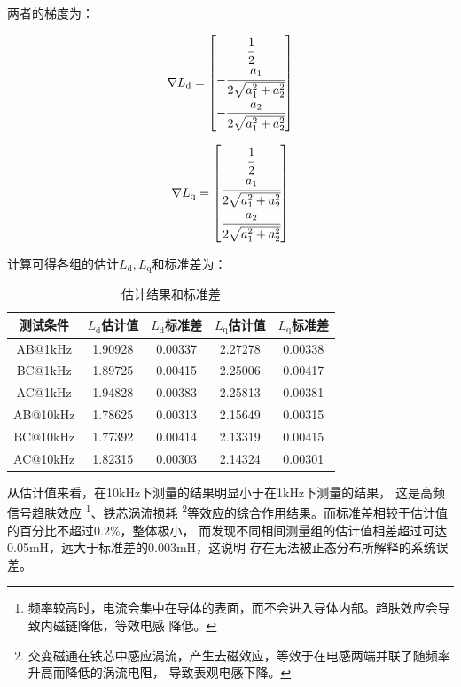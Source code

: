 两者的梯度为：

\begin{minipage}{0.5\textwidth}
    \begin{equation*}
        \nabla L_{\mathrm{d}} =\begin{bmatrix}\cfrac{1}{2}\\-\cfrac{a_{1}}{2\sqrt{a_{1}^2+a_{2}^2}}\\
        -\cfrac{a_{2}}{2\sqrt{a_{1}^2+a_{2}^2}}\end{bmatrix}
    \end{equation*}
\end{minipage}
\begin{minipage}{0.5\textwidth}
    \begin{equation*}
        \nabla L_{\mathrm{q}} =\begin{bmatrix}\cfrac{1}{2}\\
        \cfrac{a_{1}}{2\sqrt{a_{1}^2+a_{2}^2}}\\
        \cfrac{a_{2}}{2\sqrt{a_{1}^2+a_{2}^2}}\end{bmatrix}
    \end{equation*}
\end{minipage}

计算可得各组的估计\(L_{\mathrm{d}},L_{\mathrm{q}}\)和标准差为：
\begin{table}[H]
    \centering
    \begin{tabular}{|c|c|c|c|c|}
        \hline
        测试条件&\(L_{\mathrm{d}}\)估计值&\(L_{\mathrm{d}}\)标准差&\(L_{\mathrm{q}}\)估计值&\(L_{\mathrm{q}}\)标准差\\
        \hline
        AB@1kHz&
        1.90928&0.00337&2.27278&0.00338\\
        \hline
        BC@1kHz&
        1.89725&0.00415&2.25006&0.00417\\
        \hline
        AC@1kHz&
        1.94828&0.00383&2.25813&0.00381\\
        \hline
        AB@10kHz&
        1.78625&0.00313&2.15649&0.00315\\
        \hline
        BC@10kHz&
        1.77392&0.00414&2.13319&0.00415\\
        \hline
        AC@10kHz&
        1.82315&0.00303&2.14324&0.00301\\
        \hline
    \end{tabular}
    \caption{估计结果和标准差}
    \label{tab:估计结果和标准差}
\end{table}

从估计值来看，在10kHz下测量的结果明显小于在1kHz下测量的结果，
这是高频信号趋肤效应
\footnote{频率较高时，电流会集中在导体的表面，而不会进入导体内部。趋肤效应会导致内磁链降低，等效电感
降低。}、铁芯涡流损耗
\footnote{交变磁通在铁芯中感应涡流，产生去磁效应，等效于在电感两端并联了随频率升高而降低的涡流电阻，
导致表观电感下降。}等效应的综合作用结果。而标准差相较于估计值的百分比不超过\(0.2\%\)，整体极小，
而发现不同相间测量组的估计值相差超过可达0.05mH，远大于标准差的0.003mH，这说明
存在无法被正态分布所解释的系统误差。

